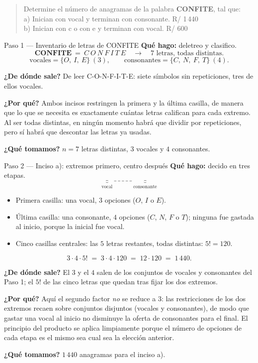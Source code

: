 \documentclass[11pt]{article}
\begin{document}
\begin{quote}
Determine el número de anagramas de la palabra \textbf{CONFITE}, tal que:\\
a) Inician con vocal y terminan con consonante. \hfill R/ 1\,440\\
b) Inician con c o con e y terminan con vocal. \hfill R/ 600
\end{quote}

\begin{paso}{Paso 1 --- Inventario de letras de CONFITE}
\textbf{Qué hago:} deletreo y clasifico.
\[
\textbf{CONFITE}\ =\ C\ O\ N\ F\ I\ T\ E \quad\longrightarrow\quad 7 \text{ letras, todas distintas}.
\]
\[
\text{vocales} = \{O,\ I,\ E\}\ (3),\qquad \text{consonantes} = \{C,\ N,\ F,\ T\}\ (4).
\]

\textbf{¿De dónde sale?} De leer C-O-N-F-I-T-E: siete símbolos sin repeticiones, tres de ellos vocales.

\textbf{¿Por qué?} Ambos incisos restringen la primera y la última casilla, de manera que lo que se necesita
es exactamente cuántas letras califican para cada extremo. Al ser todas distintas, en ningún momento habrá
que dividir por repeticiones, pero sí habrá que descontar las letras ya usadas.

\textbf{¿Qué tomamos?} $n=7$ letras distintas, $3$ vocales y $4$ consonantes.
\end{paso}

\begin{paso}{Paso 2 --- Inciso a): extremos primero, centro después}
\textbf{Qué hago:} decido en tres etapas.
\[
\underbrace{\_}_{\text{vocal}}\ \_\ \_\ \_\ \_\ \_\ \underbrace{\_}_{\text{consonante}}
\]
\begin{itemize}[leftmargin=1.4em]
\item Primera casilla: una vocal, $3$ opciones ($O$, $I$ o $E$).
\item Última casilla: una consonante, $4$ opciones ($C$, $N$, $F$ o $T$); ninguna fue gastada al inicio,
porque la inicial fue vocal.
\item Cinco casillas centrales: las $5$ letras restantes, todas distintas: $5!=120$.
\end{itemize}
\[
3\cdot 4\cdot 5! \;=\; 3\cdot 4\cdot 120 \;=\; 12\cdot 120 \;=\; 1\,440 .
\]

\textbf{¿De dónde sale?} El $3$ y el $4$ salen de los conjuntos de vocales y consonantes del Paso 1; el
$5!$ de las cinco letras que quedan tras fijar los dos extremos.

\textbf{¿Por qué?} Aquí el segundo factor \emph{no} se reduce a $3$: las restricciones de los dos extremos
recaen sobre conjuntos disjuntos (vocales y consonantes), de modo que gastar una vocal al inicio no
disminuye la oferta de consonantes para el final. El principio del producto se aplica limpiamente porque el
número de opciones de cada etapa es el mismo sea cual sea la elección anterior.

\textbf{¿Qué tomamos?} $1\,440$ anagramas para el inciso a).
\end{paso}
\end{document}
